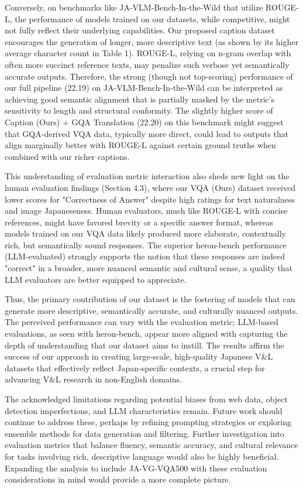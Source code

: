 \documentclass[11pt]{article}
\begin{document}
Conversely, on benchmarks like JA-VLM-Bench-In-the-Wild that utilize ROUGE-L, the performance of models trained on our datasets, while competitive, might not fully reflect their underlying capabilities. Our proposed caption dataset encourages the generation of longer, more descriptive text (as shown by its higher average character count in Table 1). ROUGE-L, relying on n-gram overlap with often more succinct reference texts, may penalize such verbose yet semantically accurate outputs. Therefore, the strong (though not top-scoring) performance of our full pipeline (22.19) on JA-VLM-Bench-In-the-Wild can be interpreted as achieving good semantic alignment that is partially masked by the metric's sensitivity to length and structural conformity. The slightly higher score of Caption (Ours) + GQA Translation (22.20) on this benchmark might suggest that GQA-derived VQA data, typically more direct, could lead to outputs that align marginally better with ROUGE-L against certain ground truths when combined with our richer captions.

This understanding of evaluation metric interaction also sheds new light on the human evaluation findings (Section 4.3), where our VQA (Ours) dataset received lower scores for "Correctness of Answer" despite high ratings for text naturalness and image Japaneseness. Human evaluators, much like ROUGE-L with concise references, might have favored brevity or a specific answer format, whereas models trained on our VQA data likely produced more elaborate, contextually rich, but semantically sound responses. The superior heron-bench performance (LLM-evaluated) strongly supports the notion that these responses are indeed "correct" in a broader, more nuanced semantic and cultural sense, a quality that LLM evaluators are better equipped to appreciate.

Thus, the primary contribution of our dataset is the fostering of models that can generate more descriptive, semantically accurate, and culturally nuanced outputs. The perceived performance can vary with the evaluation metric; LLM-based evaluations, as seen with heron-bench, appear more aligned with capturing the depth of understanding that our dataset aims to instill. The results affirm the success of our approach in creating large-scale, high-quality Japanese V\&L datasets that effectively reflect Japan-specific contexts, a crucial step for advancing V\&L research in non-English domains.

The acknowledged limitations regarding potential biases from web data, object detection imperfections, and LLM characteristics remain. Future work should continue to address these, perhaps by refining prompting strategies or exploring ensemble methods for data generation and filtering. Further investigation into evaluation metrics that balance fluency, semantic accuracy, and cultural relevance for tasks involving rich, descriptive language would also be highly beneficial. Expanding the analysis to include JA-VG-VQA500 with these evaluation considerations in mind would provide a more complete picture.
\end{document}
